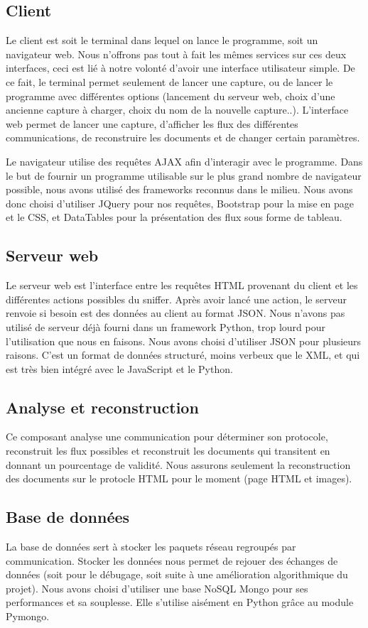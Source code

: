 \subsection{Client}
Le client est soit le terminal dans lequel on lance le programme, soit un navigateur web. Nous n'offrons pas tout à fait les mêmes services sur ces deux interfaces, ceci est lié à notre volonté d'avoir une interface utilisateur simple. 
De ce fait, le terminal permet seulement de lancer une capture, ou de lancer le programme avec différentes options (lancement du serveur web, choix d'une ancienne capture à charger, choix du nom de la nouvelle capture..).
L'interface web permet de lancer une capture, d'afficher les flux des différentes communications, de reconstruire les documents et de changer certain paramètres.

Le navigateur utilise des requêtes AJAX afin d'interagir avec  le programme.
Dans le but de fournir un programme utilisable sur le plus grand nombre de navigateur possible, nous avons utilisé des frameworks reconnus dans le milieu. Nous avons donc choisi d'utiliser JQuery pour nos requêtes, Bootstrap pour la mise en page et le CSS, et DataTables pour la présentation des flux sous forme de tableau. 

\subsection{Serveur web}
Le serveur web est l'interface entre les requêtes HTML provenant du client et les différentes actions possibles du sniffer. Après avoir lancé une action, le serveur renvoie si besoin est des données au client au format
JSON. Nous n'avons pas utilisé de serveur déjà fourni dans un framework Python, trop lourd pour l'utilisation que nous en faisons.
Nous avons choisi d'utiliser JSON pour plusieurs raisons. C'est un format de données structuré, moins verbeux que le XML, et qui est très bien intégré avec le JavaScript et le Python. 

\subsection{Analyse et reconstruction}
Ce composant analyse une communication pour déterminer son protocole, reconstruit les flux possibles et reconstruit les documents qui transitent en donnant un pourcentage de validité. Nous assurons seulement la reconstruction des documents sur le protocle HTML pour le moment (page HTML et images).

\subsection{Base de données}
La base de données sert à stocker les paquets réseau regroupés par communication. Stocker les données nous permet de rejouer des échanges de données (soit pour le débugage, soit suite à une amélioration algorithmique du projet).	
Nous avons choisi d'utiliser une base NoSQL Mongo pour ses performances et sa souplesse. Elle s'utilise aisément en Python grâce au module Pymongo.

